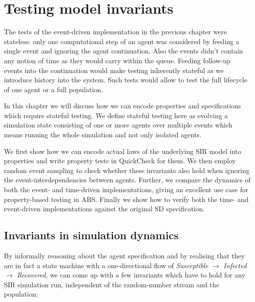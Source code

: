\chapter{Testing model invariants}
\label{ch:sir_invariants}
The tests of the event-driven implementation in the previous chapter were stateless: only one computational step of an agent was considered by feeding a single event and ignoring the agent continuation. Also the events didn't contain any notion of time as they would carry within the queue. Feeding follow-up events into the continuation would make testing inherently stateful as we introduce history into the system. Such tests would allow to test the full lifecycle of one agent or a full population.

In this chapter we will discuss how we can encode properties and specifications which require stateful testing. We define stateful testing here as evolving a simulation state consisting of one or more agents over multiple events which means running the whole simulation and not only isolated agents.

We first show how we can encode actual laws of the underlying SIR model into properties and write property tests in QuickCheck for them. We then employ random event sampling to check whether these invariants also hold when ignoring the event-interdependencies between agents. Further, we compare the dynamics of both the event- and time-driven implementations, giving an excellent use case for property-based testing in ABS. Finally we show how to verify both the time- and event-driven implementations against the original SD specification.

\section{Invariants in simulation dynamics}
\label{sec:prop_invariants_dynamics}
By informally reasoning about the agent specification and by realising that they are in fact a state machine with a one-directional flow of \textit{Susceptible} $\rightarrow$ \textit{Infected} $\rightarrow$ \textit{Recovered}, we can come up with a few invariants which have to hold for any SIR simulation run, independent of the random-number stream and the population:

